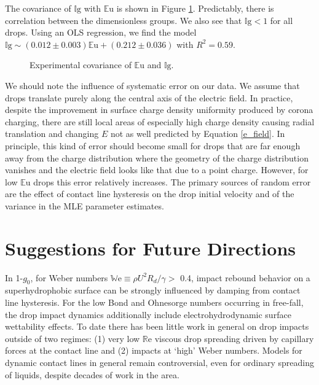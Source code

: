 \documentclass[12pt,a4paper,oneside]{book}
\begin{document}
The covariance of $\mathbb{I}\mbox{g}$ with $\mathbb{E}\mbox{u}$ is shown in Figure \ref{fig:dnumbs}. Predictably, there is correlation between the dimensionless groups. We also see that $\mathbb{I}\mbox{g} < 1$ for all drops. Using an OLS regression, we find the model $\mathbb{I}\mbox{g} \sim (0.012 \pm 0.003) \mathbb{E}\mbox{u} + (0.212 \pm 0.036) $ with $R^2 =0.59$.
\begin{figure}[htb]
    \centering
    
    \caption{Experimental covariance of $\mathbb{E}\mbox{u}$ and $\mathbb{I}\mbox{g}$.\label{fig:dnumbs}}
\end{figure}
  
We should note the influence of systematic error on our data. We assume that drops translate purely along the central axis of the electric field. In practice, despite the improvement in surface charge density uniformity produced by corona charging, there are still local areas of especially high charge density causing radial translation and changing $E$ not as well predicted by Equation \ref{e_field}.  In principle, this kind of error should become small for drops that are far enough away from the charge distribution where the geometry of the charge distribution vanishes and the electric field looks like that due to a point charge. However, for low $\mathbb{E}\mbox{u}$ drops this error relatively increases. The primary sources of random error are the effect of contact line hysteresis on the drop initial velocity and of the variance in the MLE parameter estimates.

\section{Suggestions for Future Directions}
In 1-$g_0$, for Weber numbers $\mathbb{W}\mbox{e} \equiv \rho U^2 R_d/\gamma >$ 0.4, impact rebound behavior on a superhydrophobic surface can be strongly influenced by damping from contact line hysteresis. For the low Bond and Ohnesorge numbers occurring in free-fall, the drop impact dynamics additionally include electrohydrodynamic surface wettability effects. To date there has been little work in general on drop impacts outside of two regimes: (1) very low $\mathbb{R}\mbox{e}$ viscous drop spreading driven by capillary forces at the contact line and (2) impacts at `high' Weber numbers. Models for dynamic contact lines in general remain controversial, even for ordinary spreading of liquids, despite decades of work in the area. 
\end{document}

